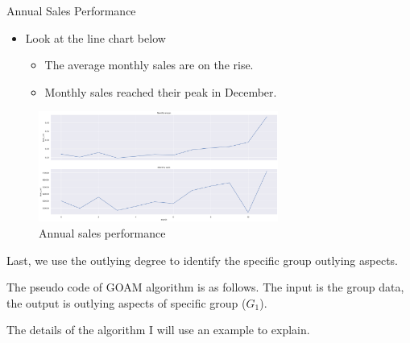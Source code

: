 \documentclass[
 size=14pt,
 paper=smartboard,  %
 mode=present, 		%
 display=slides, 	%
 style=tuliplab,  	%
 pauseslide,
 fleqn,leqno]{powerdot}
\begin{document}
\begin{slide}{Annual Sales Performance}
  \begin{itemize}
    \item
    Look at the line chart below
    \begin{itemize}
      \item
      The average monthly sales are on the rise.
      
      \item
      Monthly sales reached their peak in December.
      \end{itemize}
    \end{itemize}
    
    \begin{figure}
      \centering
      \includegraphics[width=0.7\textwidth,natwidth=938,natheight=436]{figures/line.eps}
      \caption{Annual sales performance}\label{Checking for outliers}
    \end{figure}
    
    \begin{note}
    Last,
    we use the outlying degree to identify the specific group outlying aspects.
    
    The pseudo code of GOAM algorithm is as follows.
    The input is the group data,
    the output is outlying aspects of specific group ($G_1$).
    
    The details of the algorithm I will use an example to explain.
    \end{note}

\end{slide}
\end{document}
